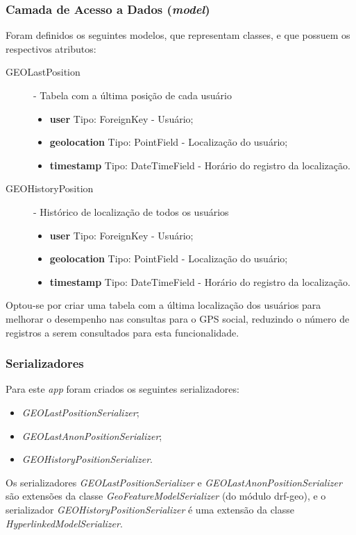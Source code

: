 \subsubsection{Camada de Acesso a Dados (\textit{model})}\label{subsubsec:gps-camada-model}
Foram definidos os seguintes modelos, que representam classes, e que possuem os respectivos atributos:
\begin{description}
    \item[GEOLastPosition] - Tabela com a última posição de cada usuário
        \begin{itemize}
            \item \textbf{user} Tipo: ForeignKey - Usuário;
            \item \textbf{geolocation} Tipo: PointField - Localização do usuário;
            \item \textbf{timestamp} Tipo: DateTimeField - Horário do registro da localização.
        \end{itemize}
    \item[GEOHistoryPosition] - Histórico de localização de todos os usuários
        \begin{itemize}
            \item \textbf{user} Tipo: ForeignKey - Usuário;
            \item \textbf{geolocation} Tipo: PointField - Localização do usuário;
            \item \textbf{timestamp} Tipo: DateTimeField - Horário do registro da localização.
        \end{itemize}
\end{description}
Optou-se por criar uma tabela com a última localização dos usuários para melhorar o desempenho nas consultas para o GPS social, reduzindo o número de registros a serem consultados para esta funcionalidade.

\subsubsection{Serializadores}
Para este \textit{app} foram criados os seguintes serializadores: %
\begin{itemize}
    \item \textit{GEOLastPositionSerializer};
    \item \textit{GEOLastAnonPositionSerializer};
    \item \textit{GEOHistoryPositionSerializer}.
\end{itemize}
Os serializadores \textit{GEOLastPositionSerializer} e \textit{GEOLastAnonPositionSerializer} são extensões da classe \mbox{\textit{GeoFeatureModelSerializer}} (do módulo \gls{drf}-geo), e o serializador \mbox{\textit{GEOHistoryPositionSerializer}} é uma extensão da classe \mbox{\textit{HyperlinkedModelSerializer}}.

